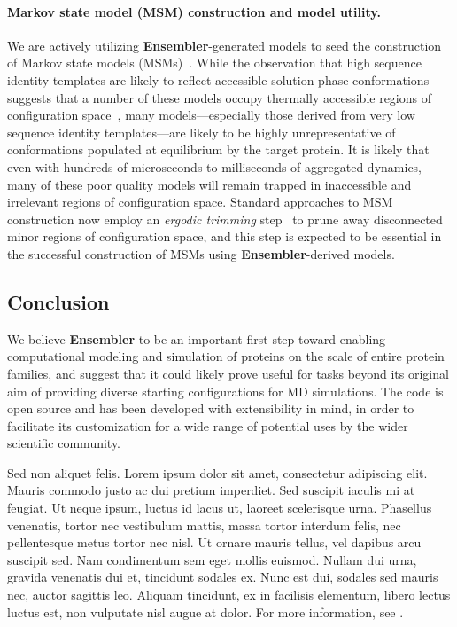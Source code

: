 \documentclass[10pt,letterpaper]{article}
\begin{document}
\paragraph{Markov state model (MSM) construction and model utility.}
We are actively utilizing {\bf Ensembler}-generated models to seed the construction of Markov state models (MSMs)~\cite{pande-beauchamp-bowman:2010:methods:markov-model-review,chodera-noe:curr-opin-struct-biol:2014:msm-review}.
While the observation that high sequence identity templates are likely to reflect accessible solution-phase conformations suggests that a number of these models occupy thermally accessible regions of configuration space~\cite{friedland:plos-comput-biol:2009:conformational-dynamics}, many models---especially those derived from very low sequence identity templates---are likely to be highly unrepresentative of conformations populated at equilibrium by the target protein.
It is likely that even with hundreds of microseconds to milliseconds of aggregated dynamics, many of these poor quality models will remain trapped in inaccessible and irrelevant regions of configuration space.
Standard approaches to MSM construction now employ an \emph{ergodic trimming} step~\cite{caflisch:jpcb:2011:msm-subgraph,msmbuilder} to prune away disconnected minor regions of configuration space, and this step is expected to be essential in the successful construction of MSMs using {\bf Ensembler}-derived models.

\subsection*{Conclusion}

We believe {\bf Ensembler} to be an important first step toward enabling computational modeling and simulation of proteins on the scale of entire protein families, and suggest that it could likely prove useful for tasks beyond its original aim of providing diverse starting configurations for MD simulations.
The code is open source and has been developed with extensibility in mind, in order to facilitate its customization for a wide range of potential uses by the wider scientific community.











Sed non aliquet felis. Lorem ipsum dolor sit amet, consectetur adipiscing elit. Mauris commodo justo ac dui pretium imperdiet. Sed suscipit iaculis mi at feugiat. Ut neque ipsum, luctus id lacus ut, laoreet scelerisque urna. Phasellus venenatis, tortor nec vestibulum mattis, massa tortor interdum felis, nec pellentesque metus tortor nec nisl. Ut ornare mauris tellus, vel dapibus arcu suscipit sed. Nam condimentum sem eget mollis euismod. Nullam dui urna, gravida venenatis dui et, tincidunt sodales ex. Nunc est dui, sodales sed mauris nec, auctor sagittis leo. Aliquam tincidunt, ex in facilisis elementum, libero lectus luctus est, non vulputate nisl augue at dolor. For more information, see .
\end{document}
